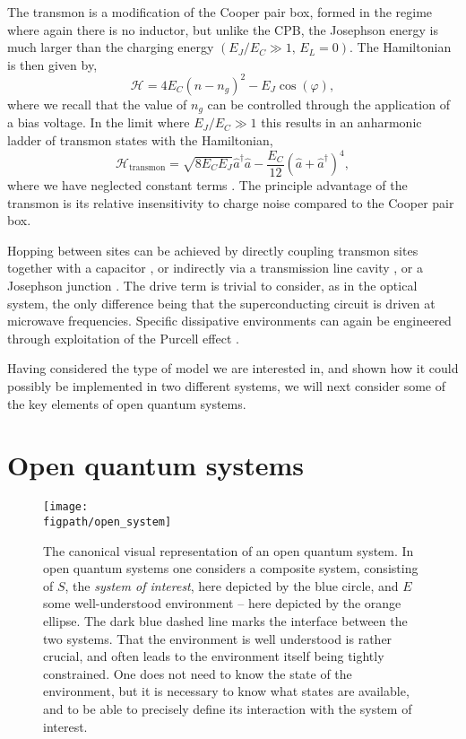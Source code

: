 The transmon is a modification of the Cooper pair box, formed in the regime where again there is no inductor, but unlike the CPB, the Josephson energy is much larger than the charging energy \((E_{J} / E_{C} \gg 1,\, E_{L} = 0)\). The Hamiltonian is then given by,
\begin{equation}
	\mathcal{H} = 4E_{C}(\hat{n} - n_{g})^{2} - E_{J}\cos(\varphi),
	\label{eq:mbq2-10}
\end{equation}
where we recall that the value of \(n_{g}\) can be controlled through the application of a bias voltage. In the limit where \(E_{J}/E_{C} \gg 1\) this results in an anharmonic ladder of transmon states with the Hamiltonian,
\begin{equation}
	\mathcal{H}_{\mathrm{transmon}} = \sqrt{8E_{C}E_{J}}\hat{a}^{\dagger}\hat{a} - \frac{E_{C}}{12}\left(\hat{a} + \hat{a}^{\dagger}\right)^{4},
	\label{eq:mbq2-11}
\end{equation}
where we have neglected constant terms \cite{Koch2007}. The principle advantage of the transmon is its relative insensitivity to charge noise compared to the Cooper pair box.

Hopping between sites can be achieved by directly coupling transmon sites together with a capacitor \cite{Wendin2007}, or indirectly via a transmission line cavity \cite{Majer2007}, or a Josephson junction \cite{Chen2014}. The drive term is trivial to consider, as in the optical system, the only difference being that the superconducting circuit is driven at microwave frequencies. Specific dissipative environments can again be engineered through exploitation of the Purcell effect \cite{Purcell1946,Fox_Purcell}.

Having considered the type of model we are interested in, and shown how it could possibly be implemented in two different systems, we will next consider some of the key elements of open quantum systems.

\section{\label{sec:OQS}Open quantum systems}

\begin{figure}[ht!]
\centering
\texttt{[image: \\figpath/open\_system]}
\caption{The canonical visual representation of an open quantum system. In open quantum systems one considers a composite system, consisting of \(S\), the \emph{system of interest}, here depicted by the blue circle, and \(E\) some well-understood environment -- here depicted by the orange ellipse. The dark blue dashed line marks the interface between the two systems. That the environment is well understood is rather crucial, and often leads to the environment itself being tightly constrained. One does not need to know the state of the environment, but it is necessary to know what states are available, and to be able to precisely define its interaction with the system of interest.}
\label{fig:oqs1-1}
\end{figure}

